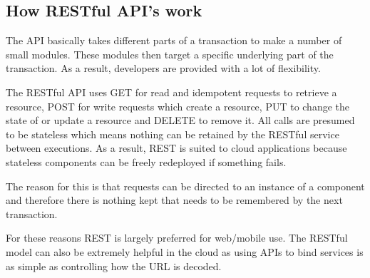 \subsection {How RESTful API's work}

The API basically takes different parts of a transaction to make a number of small modules. These modules then target a specific underlying part of the transaction. As a result, developers are provided with a lot of flexibility.

The RESTful API uses GET for read and idempotent requests to retrieve a resource,  POST for write requests which create a resource, PUT to change the state of or update a resource and DELETE to remove it. All calls are presumed to be stateless which means nothing can be retained by the RESTful service between executions. As a result,  REST is suited to cloud applications because stateless components can be freely redeployed if something fails. \cite{RESTful}

The reason for this is that requests can be directed to an instance of a component and therefore there is nothing kept that needs to be remembered by the next transaction.

For these reasons REST is largely preferred for web/mobile use. The RESTful model can also be extremely helpful in the cloud as using APIs to bind services is as simple as controlling how the URL is decoded. 

